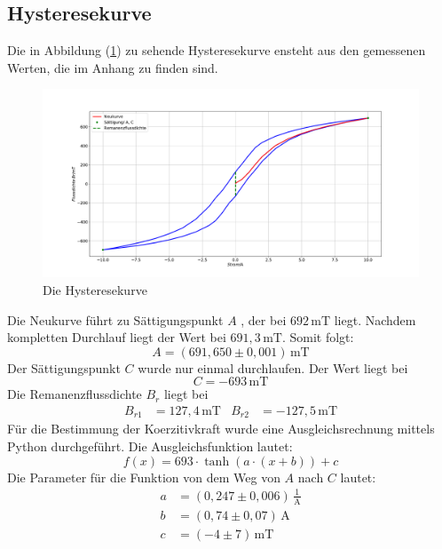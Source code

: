\subsection{Hysteresekurve}
Die in Abbildung (\ref{fig:hys}) zu sehende Hysteresekurve ensteht aus den gemessenen Werten,
die im Anhang zu finden sind.

  \begin{figure}
\centering
\includegraphics[width=\textwidth]{plothys.pdf}
\caption{Die Hysteresekurve}
\label{fig:hys}
\end{figure}
Die Neukurve führt zu Sättigungspunkt $A$ , der bei $692\, \mathrm{mT}$ liegt.
Nachdem kompletten Durchlauf liegt der Wert bei $691,3 \,\mathrm{mT}$.
Somit folgt:
\begin{equation*}
  A = (691,650 \pm 0,001)\, \mathrm{mT}
\end{equation*}
Der Sättigungspunkt $C$ wurde nur einmal durchlaufen.
Der Wert liegt bei
\begin{equation*}
  C = -693 \,\mathrm{mT}
\end{equation*}
 Die Remanenzflussdichte $B_r$ liegt bei
 \begin{align*}
   B_{r1} &= 127,4\, \mathrm{mT} & B_{r2} &= -127,5 \, \mathrm{mT}
 \end{align*}
 Für die Bestimmung der Koerzitivkraft wurde eine Ausgleichsrechnung mittels Python durchgeführt.
 Die Ausgleichsfunktion lautet:
 \begin{equation}
  f(x) = 693 \cdot \tanh(a\cdot(x + b)) + c
 \end{equation}
 Die Parameter für die Funktion von dem Weg von $A$ nach $C$ lautet:
 \begin{align*}
 a &= (0,247 \pm 0,006)\, \mathrm{\frac{1}{A}}\\
 b &= (0,74 \pm 0,07)\, \mathrm{A}\\
 c &= (-4 \pm 7)\, \mathrm{mT}
 \end{align*}

